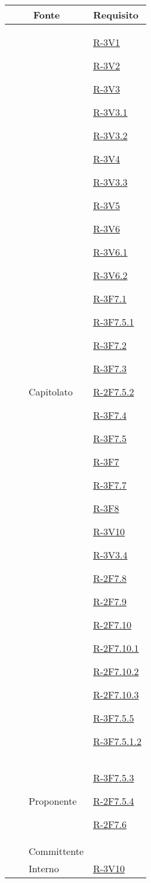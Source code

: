 \begin{longtable}{r l p{5cm} p{3cm}}
	\hline
	\multicolumn{3}{c}{Fonte} & Requisito\tabularnewline
	\midrule
	\midrule
	&  & Capitolato & \hyperlink{R-3V1}{R-3V1}
	
	\hyperlink{R-3V2}{R-3V2}
	
	\hyperlink{R-3V3}{R-3V3}
	
	\hyperlink{R-3V3.1}{R-3V3.1}
	
	\hyperlink{R-3V3.2}{R-3V3.2}
	
	\hyperlink{R-3V4}{R-3V4}
	
	\hyperlink{R-3V3.3}{R-3V3.3}
	
	\hyperlink{R-3V5}{R-3V5}
	
	\hyperlink{R-3V6}{R-3V6}
	
	\hyperlink{R-3V6.1}{R-3V6.1}
	
	\hyperlink{R-3V6.2}{R-3V6.2}
	
	\hyperlink{R-3F7.1}{R-3F7.1}
	
	\hyperlink{R-3F7.5.1}{R-3F7.5.1}
	
	\hyperlink{R-3F7.2}{R-3F7.2}
	
	\hyperlink{R-3F7.3}{R-3F7.3}
	
	\hyperlink{R-2F7.5.2}{R-2F7.5.2}
	
	\hyperlink{R-3F7.4}{R-3F7.4}
	
	\hyperlink{R-3F7.5}{R-3F7.5}
	
	\hyperlink{R-3F7}{R-3F7}
	
	\hyperlink{R-3F7.7}{R-3F7.7}
	
	\hyperlink{R-3F8}{R-3F8}
	
	\hyperlink{R-3V10}{R-3V10}
	
	\hyperlink{R-3V3.4}{R-3V3.4}
	
	\hyperlink{R-2F7.8}{R-2F7.8}
	
	\hyperlink{R-2F7.9}{R-2F7.9}
	
	\hyperlink{R-2F7.10}{R-2F7.10}
	
	\hyperlink{R-2F7.10.1}{R-2F7.10.1}
	
	\hyperlink{R-2F7.10.2}{R-2F7.10.2}
	
	\hyperlink{R-2F7.10.3}{R-2F7.10.3}
	
	\hyperlink{R-3F7.5.5}{R-3F7.5.5}
	
	\hyperlink{R-3F7.5.1.2}{R-3F7.5.1.2}\tabularnewline
	\hline
	&  & Proponente & \hyperlink{R-3F7.5.3}{R-3F7.5.3}
	
	\hyperlink{R-2F7.5.4}{R-2F7.5.4}
	
	\hyperlink{R-2F7.6}{R-2F7.6}\tabularnewline
	\hline
	&  & Committente & \tabularnewline
	\hline
	&  & Interno & \hyperlink{R-3V10}{R-3V10}
	

\end{longtable}
